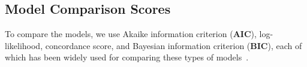 \subsection{Model Comparison Scores}

To compare the models, we use Akaike information criterion (\textbf{AIC}), log-likelihood, concordance score, and Bayesian information criterion (\textbf{BIC}), each of which has been widely used for comparing these types of models~\citep{stoica2004model,taddy2019business}. 
